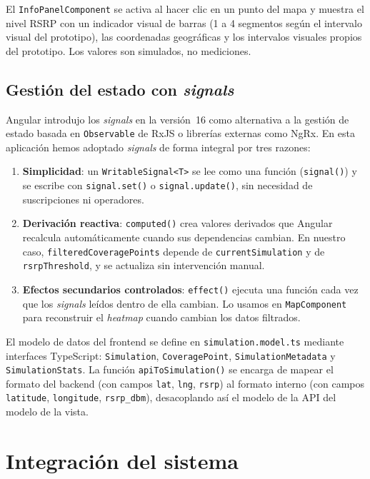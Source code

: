 El \texttt{InfoPanelComponent} se activa al hacer clic en un punto del mapa y muestra
el nivel RSRP con un indicador visual de barras (1 a 4 segmentos según el intervalo
visual del prototipo), las coordenadas geográficas y los intervalos visuales
propios del prototipo. Los valores son simulados, no mediciones.

\subsection{Gestión del estado con \textit{signals}}
\label{sec:frontend_signals}

Angular introdujo los \textit{signals} en la versión~16 como alternativa a la gestión
de estado basada en \texttt{Observable} de RxJS o librerías externas como NgRx. En
esta aplicación hemos adoptado \textit{signals} de forma integral por tres razones:

\begin{enumerate}
\item \textbf{Simplicidad}: un \texttt{WritableSignal<T>} se lee como una función
  (\texttt{signal()}) y se escribe con \texttt{signal.set()} o
  \texttt{signal.update()}, sin necesidad de suscripciones ni operadores.
\item \textbf{Derivación reactiva}: \texttt{computed()} crea valores derivados que
  Angular recalcula automáticamente cuando sus dependencias cambian. En nuestro caso,
  \texttt{filteredCoveragePoints} depende de \texttt{currentSimulation} y de
  \texttt{rsrpThreshold}, y se actualiza sin intervención manual.
\item \textbf{Efectos secundarios controlados}: \texttt{effect()} ejecuta una función
  cada vez que los \textit{signals} leídos dentro de ella cambian. Lo usamos en
  \texttt{MapComponent} para reconstruir el \textit{heatmap} cuando cambian los
  datos filtrados.
\end{enumerate}

El modelo de datos del frontend se define en \texttt{simulation.model.ts} mediante
interfaces TypeScript: \texttt{Simulation}, \texttt{CoveragePoint},
\texttt{SimulationMetadata} y \texttt{SimulationStats}. La función
\texttt{apiToSimulation()} se encarga de mapear el formato del backend (con campos
\texttt{lat}, \texttt{lng}, \texttt{rsrp}) al formato interno (con campos
\texttt{latitude}, \texttt{longitude}, \texttt{rsrp\_dbm}), desacoplando así el
modelo de la API del modelo de la vista.

\section{Integración del sistema}
\label{sec:impl_integracion}

